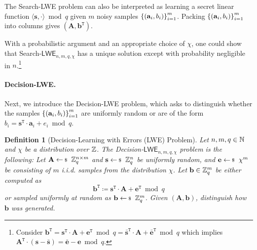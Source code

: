 \documentclass[10pt,twoside]{article}
\newtheorem{definition}[theorem]{Definition}
\renewcommand{\vec}[1]{\mathbf{#1}}
\newcommand{\mat}[1]{\mathbf{#1}}
\newcommand{\transpose}{\mathtt{T}}
\newcommand{\LWE}{\mathsf{LWE}}
\begin{document}
The Search-LWE problem can also be interpreted as learning a secret linear function $\langle \vec{s}, \cdot \rangle \bmod q$ given $m$ noisy samples $\set{(\vec{a}_i, b_i)}_{i=1}^m$. Packing $\set{(\vec{a}_i, b_i)}_{i=1}^m$ into columns gives $(\mat{A}, \vec{b}^\transpose)$.

With a probabilistic argument and an appropriate choice of $\chi$, one could show that Search-$\LWE_{n,m,q,\chi}$ has a unique solution except with probability negligible in $n$.\footnote{Consider $\vec{b}^\transpose = \vec{s}^\transpose \cdot \mat{A} + \vec{e}^\transpose \bmod q = \bar{\vec{s}}^\transpose \cdot \mat{A} + \bar{\vec{e}}^\transpose \bmod q$ which implies $\mat{A}^\transpose \cdot (\vec{s} - \bar{\vec{s}}) = \bar{\vec{e}} - \vec{e} \bmod q$.}

\paragraph{Decision-LWE.}

Next, we introduce the Decision-LWE problem, which asks to distinguish whether the samples $\set{(\vec{a}_i, b_i)}_{i=1}^m$ are uniformly random or are of the form $b_i = \vec{s}^\transpose \cdot \vec{a}_i + e_i \bmod q$.

\begin{definition}[Decision-Learning with Errors (LWE) Problem]
    Let $n,m,q \in \mathbb{N}$ and $\chi$ be a distribution over $\mathbb{Z}$.
    The Decision-$\LWE_{n,m,q,\chi}$ problem is the following:
    Let $\mat{A} \sample \ZZ_q^{n \times m}$ and $\vec{s} \sample \ZZ_q^n$ be uniformly random, and $\vec{e} \sample \chi^m$ be consisting of $m$ i.i.d. samples from the distribution $\chi$.
    Let $\vec{b} \in \ZZ_q^m$ be either computed as \[\vec{b}^\transpose \coloneqq \vec{s}^\transpose \cdot \mat{A} + \vec{e}^\transpose \bmod q\]
    or sampled uniformly at random as $\vec{b} \sample \ZZ_q^m$.
    Given $(\mat{A}, \vec{b})$, distinguish how $\vec{b}$ was generated.
\end{definition}
\end{document}

